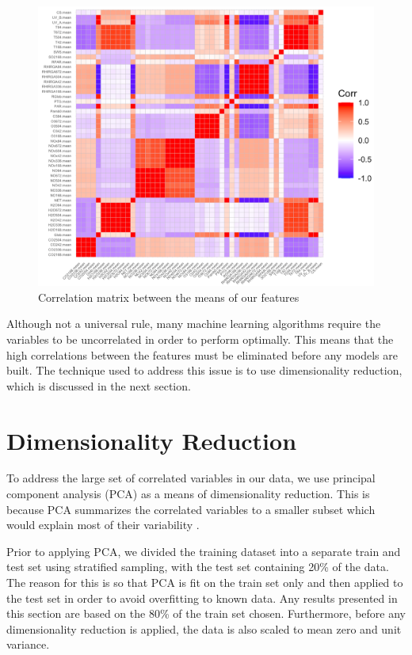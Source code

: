 \begin{figure}
   \centering
   \includegraphics[width=\textwidth]{images/correlation_matrix.png}
   \caption{Correlation matrix between the means of our features}
   \label{fig:correlation_matrix}
\end{figure}

Although not a universal rule, many machine learning algorithms require the variables to be uncorrelated in order to perform optimally. This means that the high correlations between the features must be eliminated before any models are built. The technique used to address this issue is to use dimensionality reduction, which is discussed in the next section.

\section{Dimensionality Reduction}

To address the large set of correlated variables in our data, we use principal component analysis (PCA) as a means of dimensionality reduction. This is because PCA summarizes the correlated variables to a smaller subset which would explain most of their variability \cite{intro_stat_learning}.

Prior to applying PCA, we divided the training dataset into a separate train and test set using stratified sampling, with the test set containing 20\% of the data. The reason for this is so that PCA is fit on the train set only and then applied to the test set in order to avoid overfitting to known data. Any results presented in this section are based on the 80\% of the train set chosen. Furthermore, before any dimensionality reduction is applied, the data is also scaled to mean zero and unit variance.

